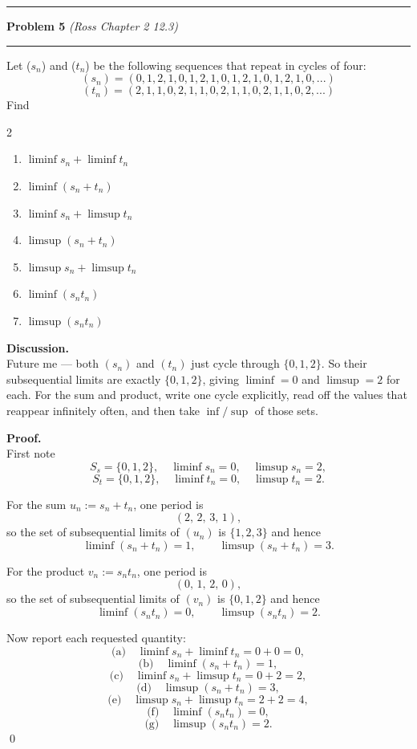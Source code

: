 \documentclass[12pt]{article}
\newcommand{\problem}[2][]{%
  \vspace{0.5em}
  \hrule\vspace{0.4em}
  \textbf{Problem #2}\if\relax\detokenize{#1}\relax\else\; \textit{(#1)}\fi
  \vspace{0.25em}\hrule\vspace{0.8em}
}
\begin{document}
\problem[Ross Chapter 2 12.3]{5}
Let ($s_n$) and ($t_n$) be the following sequences that repeat in cycles of
four:
\[
    (s_n) = (0, 1, 2, 1, 0, 1, 2, 1, 0, 1, 2, 1, 0, 1, 2, 1, 0, . . .) 
\]
\[
    (t_n) = (2, 1, 1, 0, 2, 1, 1, 0, 2, 1, 1, 0, 2, 1, 1, 0, 2, . . .)
\]
Find
\begin{multicols}{2}
\begin{enumerate}[label=(\alph*)]
    \item $\liminf s_n + \liminf t_n$
    \item $\liminf (s_n + t_n)$
    \item $\liminf s_n + \limsup t_n$
    \item $\limsup (s_n + t_n)$
    \item $\limsup s_n + \limsup t_n$
    \item $\liminf (s_n t_n)$
    \item $\limsup (s_n t_n)$
\end{enumerate}
\end{multicols}

\vspace{0.75em}
\textbf{Discussion.}\\
Future me — both $(s_n)$ and $(t_n)$ just cycle through $\{0,1,2\}$. So their
subsequential limits are exactly $\{0,1,2\}$, giving $\liminf=0$ and
$\limsup=2$ for each. For the sum and product, write one cycle explicitly,
read off the values that reappear infinitely often, and then take $\inf/\sup$
of those sets.

\vspace{0.25em}
\textbf{Proof.}\\
First note
\[
S_s=\{0,1,2\}, \quad \liminf s_n=0,\quad \limsup s_n=2,
\]
\[
S_t=\{0,1,2\}, \quad \liminf t_n=0,\quad \limsup t_n=2.
\]

For the sum $u_n:=s_n+t_n$, one period is
\[
(2,\,2,\,3,\,1),
\]
so the set of subsequential limits of $(u_n)$ is $\{1,2,3\}$ and hence
\[
\liminf (s_n+t_n)=1, \qquad \limsup (s_n+t_n)=3.
\]

For the product $v_n:=s_n t_n$, one period is
\[
(0,\,1,\,2,\,0),
\]
so the set of subsequential limits of $(v_n)$ is $\{0,1,2\}$ and hence
\[
\liminf (s_n t_n)=0, \qquad \limsup (s_n t_n)=2.
\]

Now report each requested quantity:
\[
\text{(a)}\quad \liminf s_n + \liminf t_n = 0+0 = 0,
\]
\[
\text{(b)}\quad \liminf (s_n+t_n) = 1,
\]
\[
\text{(c)}\quad \liminf s_n + \limsup t_n = 0+2 = 2,
\]
\[
\text{(d)}\quad \limsup (s_n+t_n) = 3,
\]
\[
\text{(e)}\quad \limsup s_n + \limsup t_n = 2+2 = 4,
\]
\[
\text{(f)}\quad \liminf (s_n t_n) = 0,
\]
\[
\text{(g)}\quad \limsup (s_n t_n) = 2.
\]
\qed
\end{document}
